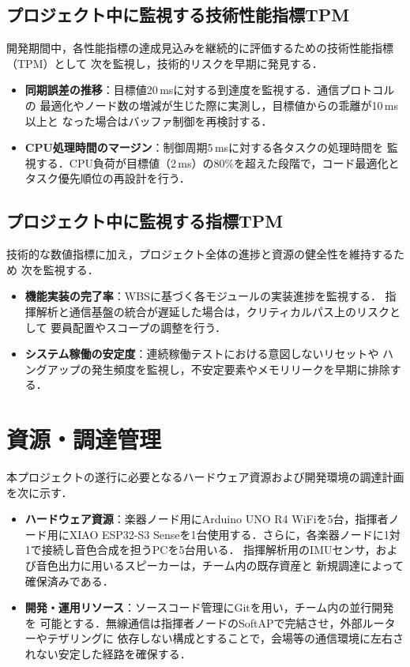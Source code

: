 \documentclass[lualatex,book,paper=a4paper,jafontsize=11.5pt,jafontscale=1.05]{jlreq}
\begin{document}
\subsection{プロジェクト中に監視する技術性能指標TPM}
開発期間中，各性能指標の達成見込みを継続的に評価するための技術性能指標（TPM）として
次を監視し，技術的リスクを早期に発見する．
\begin{itemize}
  \item \textbf{同期誤差の推移}：目標値20\,msに対する到達度を監視する．通信プロトコルの
        最適化やノード数の増減が生じた際に実測し，目標値からの乖離が10\,ms以上と
        なった場合はバッファ制御を再検討する．
  \item \textbf{CPU処理時間のマージン}：制御周期5\,msに対する各タスクの処理時間を
        監視する．CPU負荷が目標値（2\,ms）の80\%を超えた段階で，コード最適化と
        タスク優先順位の再設計を行う．
\end{itemize}

\subsection{プロジェクト中に監視する指標TPM}
技術的な数値指標に加え，プロジェクト全体の進捗と資源の健全性を維持するため
次を監視する．
\begin{itemize}
  \item \textbf{機能実装の完了率}：WBSに基づく各モジュールの実装進捗を監視する．
        指揮解析と通信基盤の統合が遅延した場合は，クリティカルパス上のリスクとして
        要員配置やスコープの調整を行う．
  \item \textbf{システム稼働の安定度}：連続稼働テストにおける意図しないリセットや
        ハングアップの発生頻度を監視し，不安定要素やメモリリークを早期に排除する．
\end{itemize}

\section{資源・調達管理}\label{sec:resource}
本プロジェクトの遂行に必要となるハードウェア資源および開発環境の調達計画を次に示す．
\begin{itemize}
  \item \textbf{ハードウェア資源}：楽器ノード用にArduino UNO R4 WiFiを5台，指揮者ノード用にXIAO ESP32-S3 Senseを1台使用する．さらに，各楽器ノードに1対1で接続し音色合成を担うPCを5台用いる．
        指揮解析用のIMUセンサ，および音色出力に用いるスピーカーは，チーム内の既存資産と
        新規調達によって確保済みである．
  \item \textbf{開発・運用リソース}：ソースコード管理にGitを用い，チーム内の並行開発を
        可能とする．無線通信は指揮者ノードのSoftAPで完結させ，外部ルーターやテザリングに
        依存しない構成とすることで，会場等の通信環境に左右されない安定した経路を確保する．
\end{itemize}
\end{document}
